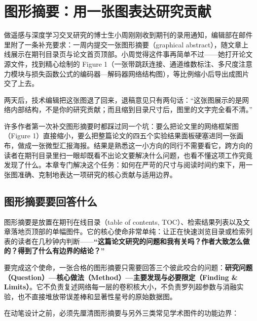 \chapter{图形摘要：用一张图表达研究贡献}

做遥感与深度学习交叉研究的博士生小周刚刚收到期刊的录用通知，编辑部在邮件里附了一条补充要求：一周内提交一张图形摘要（graphical abstract），随文章上线展示在期刊目录页与论文首页顶部。小周觉得这件事再简单不过——她打开论文源文件，找到精心绘制的 Figure 1（一张带跳跃连接、通道维数标注、多尺度注意力模块与损失函数公式的编码器—解码器网络结构图），等比例缩小后导出成图片交了上去。

两天后，技术编辑把这张图退了回来，退稿意见只有两句话：“这张图展示的是网络内部结构，不是你的研究贡献；而且缩到目录尺寸后，图里的文字完全看不清。”

许多作者第一次补交图形摘要时都踩过同一个坑：要么把论文里的网络框架图（Figure 1）直接缩小，要么把整篇论文的四五个实验结果面板硬塞进同一张画布，做成一张微型汇报海报。结果是熟悉这一小方向的同行不需要看它，跨方向的读者在期刊目录里扫一眼却既看不出论文要解决什么问题，也看不懂这项工作究竟发现了什么。本章专门解决这个任务：如何在严苛的尺寸与阅读时间约束下，用一张图准确、克制地表达一项研究的核心贡献与适用边界。

\section{图形摘要要回答什么}

图形摘要是放置在期刊在线目录（table of contents, TOC）、检索结果列表以及文章落地页顶部的单幅图件。它的核心使命非常单纯：让正在快速浏览目录或检索列表的读者在几秒钟内判断——\textbf{“这篇论文研究的问题和我有关吗？作者大致怎么做的？得到了什么有边界的结论？”}

要完成这个使命，一张合格的图形摘要只需要回答三个彼此咬合的问题：\textbf{研究问题（Question）—核心做法（Method）—主要发现与必要限定（Finding \& Limits）}。它不负责复述网络每一层的卷积核大小，不负责罗列超参数与消融实验，也不直接堆放带误差棒和显著性星号的原始数据图。

在动笔设计之前，必须先厘清图形摘要与另外三类常见学术图件的功能边界：

